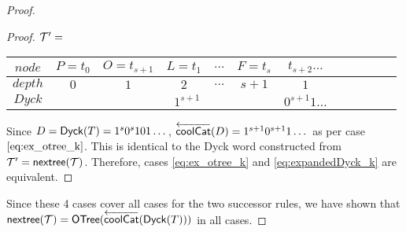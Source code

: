 \begin{proof}
\begin{proof}
    \noindent $\mathcal{T}'=$
    \begin{center}
	\begin{tabular}{ |c|c|c|c|c|c|c|c|c|c|c|c| } 
	    \hline

	    $node$ & $P=t_0$ & $O=t_{s+1}$& $L=t_1$ & $\dots$ & $F=t_s$  & $t_{s+2}\dots$ \\
	    \hline
	    $depth$ & $0$ & $1$ & $2$ & $\dots$ & $s+1$ & $1$  \\
	    \hline
	    $Dyck$ &  &  \multicolumn{4}{|c|}{$1^{s+1}$} &  $0^{s+1}1\dots$   \\
	    \hline
	\end{tabular}
    \end{center}

    Since $D=\mathsf{Dyck}{(T)}=1^s0^s101\dots$, $\overleftarrow{\mathsf{coolCat}}{(D)}=1^{s+1}0^{s+1}1\dots$ as per case $\eqref{eq:ex_otree_k}$.  This is identical to the Dyck word constructed from $\mathcal{T}'=\mathsf{nextree}{(\mathcal{T})}$.  Therefore, cases \eqref{eq:ex_otree_k} and \eqref{eq:expandedDyck_k} are equivalent.

\end{proof}

Since these 4 cases cover all cases for the two successor rules, we have shown that $\mathsf{nextree}{(\mathcal{T})}=\mathsf{OTree}{(\overleftarrow{\mathsf{coolCat}}{(\mathsf{Dyck}{(T)})})}$ in all cases. 
\end{proof}

